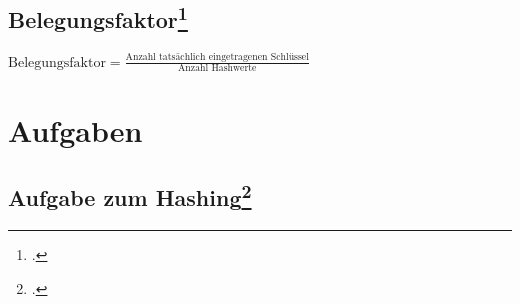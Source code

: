 \documentclass{lehramt-informatik}
\begin{document}
\section{Belegungsfaktor\footcite[Seite 29]{aud:fs:tafeluebung-10}}

$\text{Belegungsfaktor} =
\frac{\text{Anzahl tatsächlich eingetragenen Schlüssel}}
{\text{Anzahl Hashwerte}}$


\chapter{Aufgaben}

\section{Aufgabe zum Hashing\footcite[Seite 1]{aud:ab:5}}
\end{document}
